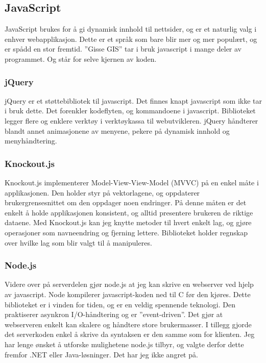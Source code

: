 \documentclass[12pt,twoside,onecolumn]{article}
\begin{document}
	\subsection{JavaScript}
	
		JavaScript brukes for å gi dynamisk innhold til nettsider, og er et naturlig valg i enhver webapplikasjon. Dette er et språk som bare blir mer og mer populært, og er spådd en stor fremtid. ''Gisse GIS'' tar i bruk javascript i mange deler av programmet. Og står for selve kjernen av koden. 
		
		\subsubsection{jQuery\cite{jquery}}
		
		jQuery er et støttebibliotek til javascript. Det finnes knapt javascript som ikke tar i bruk dette. Det forenkler kodeflyten, og kommandoene i javascript. Biblioteket legger flere og enklere verktøy i verktøykassa til webutvikleren. jQuery håndterer blandt annet animasjonene av menyene, pekere på dynamisk innhold og menyhåndtering.
		
		\subsubsection{Knockout.js\cite{knockout}}
		
		Knockout.js implementerer Model-View-View-Model (MVVC) på en enkel måte i applikasjonen. Den holder styr på vektorlagene, og oppdaterer brukergrensesnittet om den oppdager noen endringer. På denne måten er det enkelt å holde applikasjonen konsistent, og alltid presentere brukeren de riktige dataene. Med Knockout.js kan jeg knytte metoder til hvert enkelt lag, og gjøre operasjoner som navneendring og fjerning lettere. Biblioteket holder regnskap over hvilke lag som blir valgt til å manipuleres. 
		
		\subsubsection{Node.js\cite{node}}
		
		Videre over på serverdelen gjør node.js at jeg kan skrive en webserver ved hjelp av javascript. Node kompilerer javascript-koden ned til C før den kjøres. Dette biblioteket er i vinden for tiden, og er en veldig spennende teknologi. Den praktiserer asynkron I/O-håndtering og er ''event-driven''. Det gjør at webserveren enkelt kan skalere og håndtere store brukermasser. I tillegg gjorde det serverkoden enkel å skrive da syntaksen er den samme som for klienten. Jeg har lenge ønsket å utforske mulighetene node.js tilbyr, og valgte derfor dette fremfor .NET eller Java-løsninger. Det har jeg ikke angret på.
		
\end{document}
